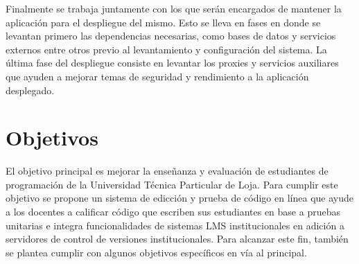 Finalmente se trabaja juntamente con los que serán encargados de mantener la aplicación para el despliegue del mismo. Esto se lleva en fases en donde se levantan primero las dependencias necesarias, como bases de datos y servicios externos entre otros previo al levantamiento y configuración del sistema. La última fase del despliegue consiste en levantar los proxies y servicios auxiliares que ayuden a mejorar temas de seguridad y rendimiento a la aplicación desplegado.

\section{Objetivos}
El objetivo principal es mejorar la enseñanza y evaluación de estudiantes de programación de la Universidad Técnica Particular de Loja. Para cumplir este objetivo se propone un sistema de edicción y prueba de código en línea que ayude a los docentes a calificar código que escriben sus estudiantes en base a pruebas unitarias e integra funcionalidades de sistemas LMS  institucionales en adición a servidores de control de versiones institucionales. Para alcanzar este fin, también se plantea cumplir con algunos objetivos específicos en vía al principal. 

